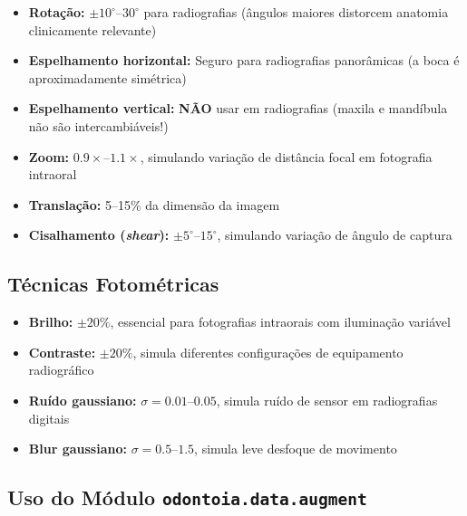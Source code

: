 \begin{itemize}
  \item \textbf{Rotação:} $\pm 10^\circ$--$30^\circ$ para radiografias (ângulos
        maiores distorcem anatomia clinicamente relevante)
  \item \textbf{Espelhamento horizontal:} Seguro para radiografias panorâmicas
        (a boca é aproximadamente simétrica)
  \item \textbf{Espelhamento vertical:} \textbf{NÃO} usar em radiografias
        (maxila e mandíbula não são intercambiáveis!)
  \item \textbf{Zoom:} $0.9\times$--$1.1\times$, simulando variação de distância
        focal em fotografia intraoral
  \item \textbf{Translação:} 5--15\% da dimensão da imagem
  \item \textbf{Cisalhamento (\textit{shear}):} $\pm 5^\circ$--$15^\circ$,
        simulando variação de ângulo de captura
\end{itemize}

\subsection{Técnicas Fotométricas}

\begin{itemize}
  \item \textbf{Brilho:} $\pm 20\%$, essencial para fotografias intraorais com
        iluminação variável
  \item \textbf{Contraste:} $\pm 20\%$, simula diferentes configurações de
        equipamento radiográfico
  \item \textbf{Ruído gaussiano:} $\sigma = 0.01$--$0.05$, simula ruído de
        sensor em radiografias digitais
  \item \textbf{Blur gaussiano:} $\sigma = 0.5$--$1.5$, simula leve desfoque
        de movimento
\end{itemize}

\subsection{Uso do Módulo \texttt{odontoia.data.augment}}

